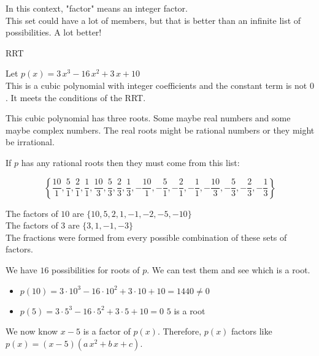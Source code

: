 \documentclass{ximera}
\begin{document}
In this context, "factor" means an integer factor.  \\

This set could have a lot of members, but that is better than an infinite list of possibilities.  A lot better! \\





\begin{example} RRT


Let $p(x) = 3\, x^3 - 16 \, x^2 + 3 \, x + 10$ \\


This is a cubic polynomial with integer coefficients and the constant term is not $0$. It meets the conditions of the RRT.


This cubic polynomial has three roots.  Some maybe real numbers and some maybe complex numbers. The real roots might be rational numbers or they might be irrational.

If $p$ has any rational roots then they must come from this list:


\[
\left\{  \frac{10}{1},  \frac{5}{1}, \frac{2}{1}, \frac{1}{1}, \frac{10}{3},  \frac{5}{3}, \frac{2}{3}, \frac{1}{3},   -\frac{10}{1},  -\frac{5}{1}, -\frac{2}{1}, -\frac{1}{1}, -\frac{10}{3},  -\frac{5}{3}, -\frac{2}{3}, -\frac{1}{3}                   \right\}
\]


The factors of $10$ are $\{ 10, 5, 2, 1, -1, -2, -5, -10 \}$ \\

The factors of $3$ are $\{ 3, 1, -1, -3 \}$ \\


The fractions were formed from every possible combination of these sets of factors.


We have $16$ possibilities for roots of $p$.  We can test them and see which is a root.


\begin{itemize}
\item $p(10) =  3 \cdot 10^3 - 16 \cdot 10^2 + 3 \cdot 10 + 10 = 1440 \ne 0$ \\
\item $p(5) =  3 \cdot 5^3 - 16 \cdot 5^2 + 3 \cdot 5 + 10 = 0$  $5$ is a root\\
\end{itemize}


We now know $x-5$ is a factor of $p(x)$.  Therefore, $p(x)$ factors like $p(x) = (x-5) (a \, x^2 + b \, x + c)$.








\end{example}
\end{document}
